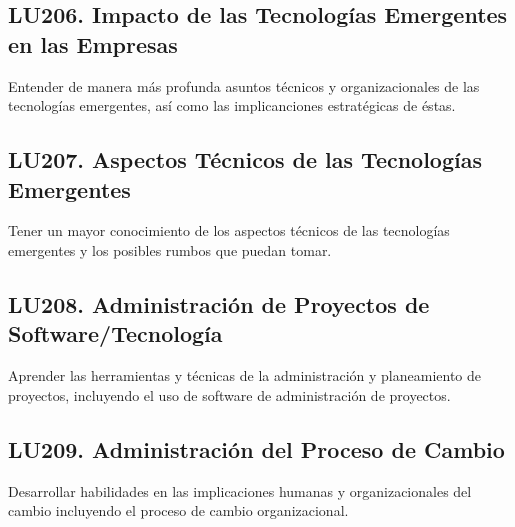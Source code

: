 \subsection{LU206. Impacto de las Tecnologías Emergentes en las Empresas}\label{sec:LU206}
\begin{LearningUnit}
\begin{LUGoal}
\item Entender de manera más profunda asuntos técnicos y organizacionales de las tecnologías emergentes, así como las implicanciones estratégicas de éstas.
\end{LUGoal}

\end{LearningUnit}

\subsection{LU207. Aspectos Técnicos de las Tecnologías Emergentes}\label{sec:LU207}
\begin{LearningUnit}
\begin{LUGoal}
\item Tener un mayor conocimiento de los aspectos técnicos de las tecnologías emergentes y los posibles rumbos que puedan tomar.
\end{LUGoal}

\end{LearningUnit}

\subsection{LU208. Administración de Proyectos de Software/Tecnología}\label{sec:LU208}
\begin{LearningUnit}
\begin{LUGoal}
\item Aprender las herramientas y técnicas de la administración y planeamiento de proyectos, incluyendo el uso de software de administración de proyectos.
\end{LUGoal}

\end{LearningUnit}

\subsection{LU209. Administración del Proceso de Cambio}\label{sec:LU209}
\begin{LearningUnit}
\begin{LUGoal}
\item Desarrollar habilidades en las implicaciones humanas y organizacionales del cambio incluyendo el proceso de cambio organizacional.
\end{LUGoal}

\end{LearningUnit}

